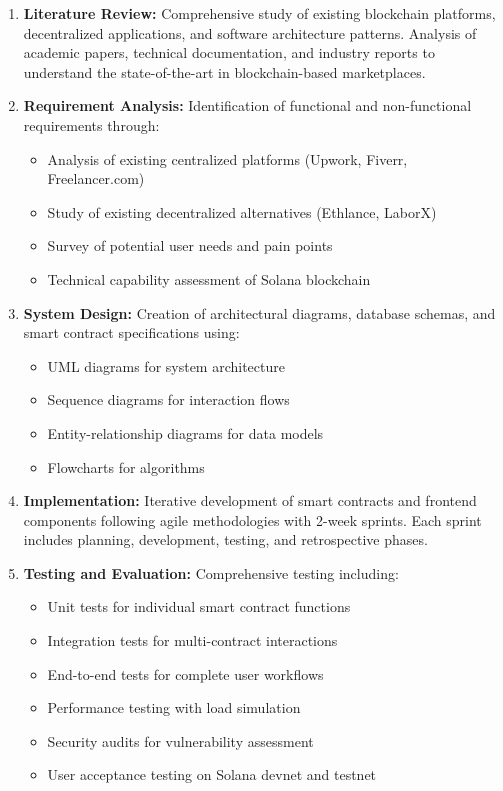 \documentclass[a4paper,13pt,twoside]{report}
\theoremstyle{definition}
\begin{document}
\begin{enumerate}
    \item \textbf{Literature Review:} Comprehensive study of existing blockchain platforms, decentralized applications, and software architecture patterns. Analysis of academic papers, technical documentation, and industry reports to understand the state-of-the-art in blockchain-based marketplaces.

    \item \textbf{Requirement Analysis:} Identification of functional and non-functional requirements through:
    \begin{itemize}
        \item Analysis of existing centralized platforms (Upwork, Fiverr, Freelancer.com)
        \item Study of existing decentralized alternatives (Ethlance, LaborX)
        \item Survey of potential user needs and pain points
        \item Technical capability assessment of Solana blockchain
    \end{itemize}

    \item \textbf{System Design:} Creation of architectural diagrams, database schemas, and smart contract specifications using:
    \begin{itemize}
        \item UML diagrams for system architecture
        \item Sequence diagrams for interaction flows
        \item Entity-relationship diagrams for data models
        \item Flowcharts for algorithms
    \end{itemize}

    \item \textbf{Implementation:} Iterative development of smart contracts and frontend components following agile methodologies with 2-week sprints. Each sprint includes planning, development, testing, and retrospective phases.

    \item \textbf{Testing and Evaluation:} Comprehensive testing including:
    \begin{itemize}
        \item Unit tests for individual smart contract functions
        \item Integration tests for multi-contract interactions
        \item End-to-end tests for complete user workflows
        \item Performance testing with load simulation
        \item Security audits for vulnerability assessment
        \item User acceptance testing on Solana devnet and testnet
    \end{itemize}


\end{enumerate}
\end{document}
